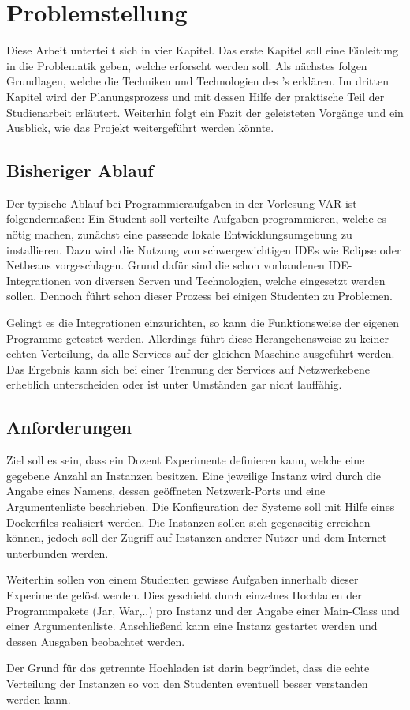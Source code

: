 \chapter{Problemstellung}
Diese Arbeit unterteilt sich in vier Kapitel.
Das erste Kapitel soll eine Einleitung in die Problematik geben, welche erforscht werden soll.
Als nächstes folgen Grundlagen, welche die Techniken und Technologien des 's erklären.
Im dritten Kapitel wird der Planungsprozess und mit dessen Hilfe der praktische Teil der Studienarbeit erläutert.
Weiterhin folgt ein Fazit der geleisteten Vorgänge und ein Ausblick, wie das Projekt weitergeführt werden könnte.

\section{Bisheriger Ablauf}
Der typische Ablauf bei Programmieraufgaben in der Vorlesung \ac{VAR} ist folgendermaßen:
Ein Student soll verteilte Aufgaben programmieren, welche es nötig machen, zunächst eine passende lokale Entwicklungsumgebung zu installieren.
Dazu wird die Nutzung von schwergewichtigen \acp{IDE} wie Eclipse oder Netbeans vorgeschlagen.
Grund dafür sind die schon vorhandenen \ac{IDE}-Integrationen von diversen Serven und Technologien, welche eingesetzt werden sollen.
Dennoch führt schon dieser Prozess bei einigen Studenten zu Problemen.
\par
Gelingt es die Integrationen einzurichten, so kann die Funktionsweise der eigenen Programme getestet werden.
Allerdings führt diese Herangehensweise zu keiner echten Verteilung, da alle Services auf der gleichen Maschine ausgeführt werden.
Das Ergebnis kann sich bei einer Trennung der Services auf Netzwerkebene erheblich unterscheiden oder ist unter Umständen gar nicht lauffähig.
\par
[TODO: Beispiel einer Aufgabe z.B. RMI-Chat]
\section{Anforderungen}
Ziel soll es sein, dass ein Dozent Experimente definieren kann, welche eine gegebene Anzahl an Instanzen besitzen.
Eine jeweilige Instanz wird durch die Angabe eines Namens, dessen geöffneten Netzwerk-Ports und eine Argumentenliste beschrieben.
Die Konfiguration der Systeme soll mit Hilfe eines Dockerfiles realisiert werden.
Die Instanzen sollen sich gegenseitig erreichen können, jedoch soll der Zugriff auf Instanzen anderer Nutzer und dem Internet unterbunden werden.
\par
Weiterhin sollen von einem Studenten gewisse Aufgaben innerhalb dieser Experimente gelöst werden.
Dies geschieht durch einzelnes Hochladen der Programmpakete (Jar, War,..) pro Instanz und der Angabe einer Main-Class und einer Argumentenliste.
Anschließend kann eine Instanz gestartet werden und dessen Ausgaben beobachtet werden.
\par
Der Grund für das getrennte Hochladen ist darin begründet, dass die echte Verteilung der Instanzen so von den Studenten eventuell besser verstanden werden kann.

